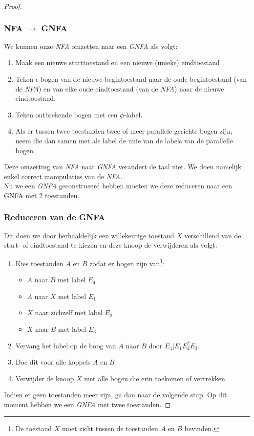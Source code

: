 \begin{proof}
\subsubsection*{NFA $\rightarrow$ GNFA}
We kunnen onze \emph{NFA} omzetten naar een \emph{GNFA} als volgt:
\begin{enumerate}
\item Maak een nieuwe starttoestand en een nieuwe (unieke) eindtoestand
\item Teken $\epsilon$-bogen van de nieuwe begintoestand naar de oude begintoestand (van de \emph{NFA}) en van elke oude eindtoestand (van de \emph{NFA}) naar de nieuwe eindtoestand.
\item Teken ontbrekende bogen met een $\phi$-label.
\item Als er tussen twee toestanden twee of meer parallele gerichte bogen zijn, neem die dan samen met als label de unie van de labels van de parallelle bogen.
\end{enumerate}
Deze omzetting van \emph{NFA} naar \emph{GNFA} verandert de taal niet. We doen namelijk enkel correct manipulaties van de \emph{NFA}.\\
Nu we een \emph{GNFA} geconstrueerd hebben moeten we deze reduceren naar een GNFA met 2 toestanden.

\subsubsection*{Reduceren van de GNFA}
Dit doen we door herhaaldelijk een willekeurige toestand $X$ verschillend van de start- of eindtoestand te kiezen en deze knoop de verwijderen als volgt:
\begin{enumerate}
\item Kies toestanden $A$ en $B$ zodat er bogen zijn van\footnote{De toestand $X$ moet zicht tussen de toestanden $A$ en $B$ bevinden.}:
\begin{itemize}
\item $A$ naar $B$ met label $E_4$
\item $A$ naar $X$ met label $E_1$
\item $X$ naar zichzelf met label $E_2$
\item $X$ naar $B$ met label $E_3$
\end{itemize}
\item Vervang het label op de boog van $A$ naar $B$ door $E_4 | E_1 E_2^* E_3$.
\item Doe dit voor alle koppels $A$ en $B$
\item Verwijder de knoop $X$ met alle bogen die erin toekomen of vertrekken.
\end{enumerate}
Indien er geen toestanden meer zijn, ga dan naar de volgende stap. Op dit moment hebben we een \emph{GNFA} met twee toestanden.


\end{proof}
